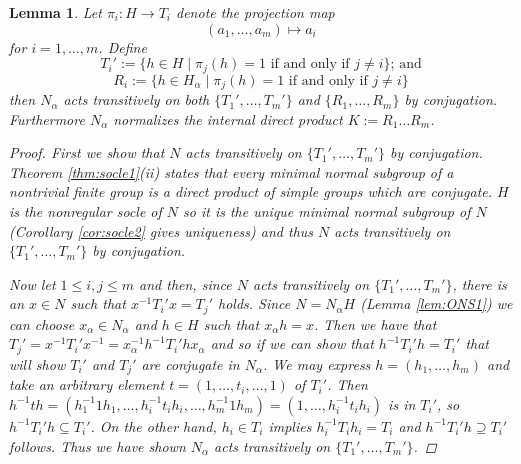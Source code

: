 \documentclass[]{article}
\newtheorem{lem}[thm]{Lemma}
\theoremstyle{definition}
\begin{document}
\begin{lem} \label{lem:ONS2}
	Let $\pi_i:H \rightarrow T_i$ denote the projection map 
	$$(a_1,\dots,a_m) \mapsto a_i$$
	for $i=1,\dots,m$. Define $$T_i':= \{h \in H \; | \; \pi_j(h)=1 \mbox{ if and only if } j \neq i \} \mbox{; and}$$ $$R_i:= \{h \in H_\alpha \; | \; \pi_j(h)=1 \mbox{ if and only if } j \neq i \}$$
	then $N_\alpha$ acts transitively on both $\{T_1',\dots,T_m' \}$ and $\{R_1,\dots,R_m \}$ by conjugation. Furthermore $N_\alpha$ normalizes the internal direct product $K:=R_1 \dots R_m$.
	\begin{proof}
		First we show that $N$ acts transitively on $\{T_1',\dots,T_m' \}$ by conjugation. Theorem \ref{thm:socle1}(ii) states that every minimal normal subgroup of a nontrivial finite group is a direct product of simple groups which are conjugate. $H$ is the nonregular socle of $N$ so it is the unique minimal normal subgroup of $N$ (Corollary \ref{cor:socle2} gives uniqueness) and thus $N$ acts transitively on $\{T_1',\dots,T_m' \}$ by conjugation.
		
		Now let $1 \leq i,j \leq m$ and then, since $N$ acts transitively on $\{T_1',\dots,T_m' \}$, there is an $x \in N$ such that $x^{-1}T_i'x = T_j'$ holds. Since $N=N_\alpha H$ (Lemma \ref{lem:ONS1}) we can choose $x_\alpha \in N_\alpha$ and $h \in H$ such that $x_\alpha h=x$. Then we have that $T_j' = x^{-1}T_i' x^{-1} = x_\alpha^{-1}h^{-1} T_i' h x_\alpha$ and so if we can show that $h^{-1}T_i' h = T_i'$ that will show $T_i'$ and $T_j'$ are conjugate in $N_\alpha$. We may express $h=(h_1,\dots,h_m)$ and take an arbitrary element $t = (1,\dots,t_i,\dots,1)$ of $T_i'$. Then $h^{-1}th = (h_1^{-1}1h_1,\dots,h_i^{-1}t_ih_i,\dots, h_m^{-1}1h_m) = (1,\dots,h_i^{-1}t_ih_i)$ is in $T_i'$, so $h^{-1}T_i'h \subseteq T_i'$. On the other hand, $h_i \in T_i$ implies $h_i^{-1}T_ih_i = T_i$ and $h^{-1}T_i'h \supseteq T_i'$ follows. Thus we have shown $N_\alpha$ acts transitively on $\{T_1',\dots,T_m' \}$.
		

\end{proof}
\end{lem}
\end{document}
